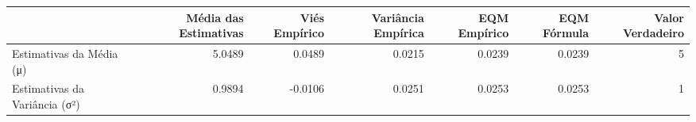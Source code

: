 \begin{tabular}{lrrrrrr}
\toprule
 & Média das Estimativas & Viés Empírico & Variância Empírica & EQM Empírico & EQM Fórmula & Valor Verdadeiro \\
\midrule
Estimativas da Média (μ) & 5.0489 & 0.0489 & 0.0215 & 0.0239 & 0.0239 & 5 \\
Estimativas da Variância (σ²) & 0.9894 & -0.0106 & 0.0251 & 0.0253 & 0.0253 & 1 \\
\bottomrule
\end{tabular}
